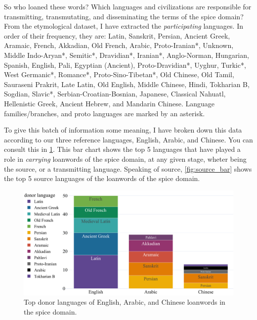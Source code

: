 
So who loaned these words? Which languages and civilizations are responsible for transmitting, transmutating, and disseminating the terms of the spice domain? From the etymological dataset, I have extracted the \textit{participating} languages. In order of their frequency, they are: Latin, Sanskrit, Persian, Ancient Greek, Aramaic, French, Akkadian, Old French, Arabic, Proto-Iranian*, Unknown, Middle Indo-Aryan*, Semitic*, Dravidian*, Iranian*, Anglo-Norman, Hungarian, Spanish, English, Pali, Egyptian (Ancient), Proto-Dravidian*, Uyghur, Turkic*, West Germanic*, Romance*, Proto-Sino-Tibetan*, Old Chinese, Old Tamil, Sauraseni Prakrit, Late Latin, Old English, Middle Chinese, Hindi, Tokharian B, Sogdian, Slavic*, Serbian-Croatian-Bosnian, Japanese, Classical Nahuatl, Hellenistic Greek, Ancient Hebrew, and Mandarin Chinese. Language families/branches, and proto languages are marked by an asterisk.


To give this batch of information some meaning, I have broken down this data according to our three reference languages, English, Arabic, and Chinese. You can consult this in \cref{fig:donor_bar}. This bar chart shows the top 5 languages that have played a role in \textit{carrying} loanwords of the spice domain, at any given stage, wheter being the source, or a transmitting language. Speaking of source, \cref{fig:source_bar} shows the top 5 source languages of the loanwords of the spice domain.

\begin{figure}[!ht]
  \centering
  \includegraphics[width=\linewidth]{imgs/plots/donor_bar.pdf}
  \caption{Top donor languages of English, Arabic, and Chinese loanwords in the spice domain.}
  \label{fig:donor_bar}
\end{figure}

